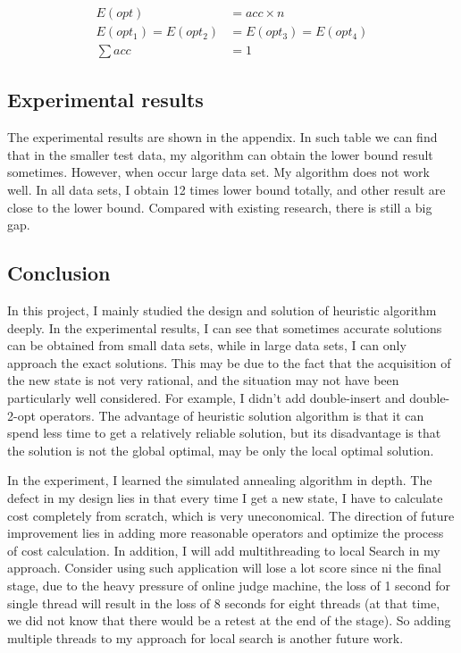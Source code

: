 \documentclass[conference,compsoc]{IEEEtran}
\begin{document}
\begin{equation}
\begin{aligned}
E(opt)&=acc\times n\\
E(opt_1)=E(opt_2)&=E(opt_3)=E(opt_4)\\
\sum acc &= 1
\end{aligned}
\end{equation}


\subsection{Experimental results}
The experimental results are shown in the appendix. In such table we can find that in the smaller test data, my algorithm can obtain the lower bound result sometimes. However, when occur large data set. My algorithm does not work well. In all data sets, I obtain 12 times lower bound totally, and other result are close to the lower bound. Compared with existing research, there is still a big gap.


\subsection{Conclusion}
In this project, I mainly studied the design and solution of heuristic algorithm deeply. In the experimental results, I can see that sometimes accurate solutions can be obtained from small data sets, while in large data sets, I can only approach the exact solutions. This may be due to the fact that the acquisition of the new state is not very rational, and the situation may not have been particularly well considered. For example, I didn't add double-insert and double-2-opt operators. The advantage of heuristic solution algorithm is that it can spend less time to get a relatively reliable solution, but its disadvantage is that the solution is not the global optimal, may be only the local optimal solution. 

In the experiment, I learned the simulated annealing algorithm in depth. The defect in my design lies in that every time I get a new state, I have to calculate cost completely from scratch, which is very uneconomical. The direction of future improvement lies in adding more reasonable operators and optimize the process of cost calculation. In addition, I will add multithreading to local Search in my approach. Consider using such application will lose a lot score since ni the final stage, due to the heavy pressure of online judge machine, the loss of 1 second for single thread will result in the loss of 8 seconds for eight threads (at that time, we did not know that there would be a retest at the end of the stage). So adding multiple threads to my approach for local search is another future work.
\end{document}
